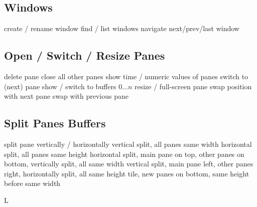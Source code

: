 \subsection{Windows}{}
	{create / rename window}
	{find / list windows}
	{navigate next/prev/last window}

\subsection{Open / Switch / Resize Panes}{}
	{delete pane}
	{close all other panes}
	{show time / numeric values of panes}
	{switch to (next) pane}
	{show / switch to buffers $0 \ldots n$}
	{resize / full-screen pane}
	{swap position with next pane}
	{swap with previous pane}

\subsection{Split Panes \or Buffers}{}
	{split pane vertically / horizontally}
	{vertical split, all panes same width}
	{horizontal split, all panes same height}
	{horizontal split, main pane on top, other panes on bottom, vertically split, all same width}
	{vertical split, main pane left, other panes right, horizontally split, all same height}
	{tile, new panes on bottom, same height before same width}

\copyrightnotice

\supereject
\if L\lr \else\null\vfill\eject\fi
\bye

